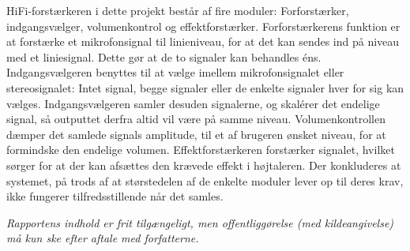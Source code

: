 \begin{multicols}{2}
{\begin{minipage}{2.8in}
HiFi-forstærkeren i dette projekt består af fire moduler: Forforstærker, indgangsvælger, volumenkontrol og effektforstærker. Forforstærkerens funktion er at forstærke et mikrofonsignal til linieniveau, for at det kan sendes ind på niveau med et liniesignal. Dette gør at de to signaler kan behandles éns.
Indgangsvælgeren benyttes til at vælge imellem mikrofonsignalet eller stereosignalet: Intet signal, begge signaler eller de enkelte signaler hver for sig kan vælges. Indgangsvælgeren samler desuden signalerne, og skalérer det endelige signal, så outputtet derfra altid vil være på samme niveau.
Volumenkontrollen dæmper det samlede signals amplitude, til et af brugeren ønsket niveau, for at formindske den endelige volumen.
Effektforstærkeren forstærker signalet, hvilket sørger for at der kan afsættes den krævede effekt i højtaleren.
Der konkluderes at systemet, på trods af at størstedelen af de enkelte moduler lever op til deres krav, ikke fungerer tilfredsstillende når det samles.
\end{minipage}}
\newline
\end{multicols}

\textit{\scriptsize{Rapportens indhold er frit tilgængeligt, men offentliggørelse (med kildeangivelse) må kun ske efter aftale med forfatterne.}}